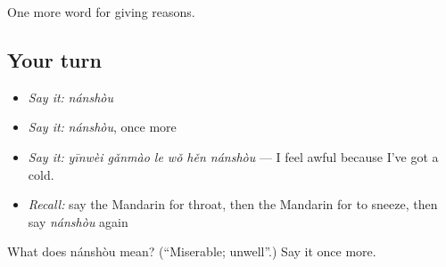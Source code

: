 \begin{grammarlens}[title={What you've built}]
One more word for giving reasons.
\end{grammarlens}

\subsection*{Your turn}
\begin{itemize}
\raggedright
  \item \emph{Say it:} \emph{nánshòu}
  \item \emph{Say it:} \emph{nánshòu}, once more
  \item \emph{Say it:} \emph{yīnwèi gǎnmào le wǒ hěn nánshòu} — I feel awful because I've got a cold.
  \item \emph{Recall:} say the Mandarin for throat, then the Mandarin for to sneeze, then say \emph{nánshòu} again
\end{itemize}

\begin{tcolorbox}[breakable,colback=teal!4,colframe=teal!35!black,title={Before you move on}]
What does nánshòu mean? (\textquotedblleft{}Miserable; unwell\textquotedblright{}.) Say it once more.
\end{tcolorbox}
